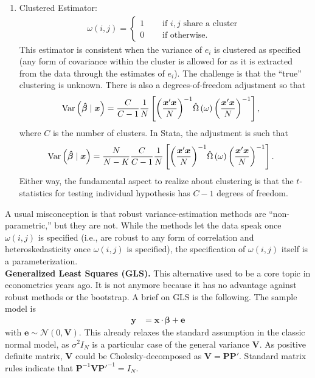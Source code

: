 \begin{enumerate}
\item Clustered Estimator: 
		\begin{align}
			\omega \left( i, j \right) = \left\{
        \begin{array}{ll}
            1 & \quad \text{ if }i,j \text{ share a cluster } \\
            0 & \quad \text{ if otherwise}.
        \end{array}
    		\right.
		\end{align}
This estimator is consistent when the variance of $e_i$ is clustered as specified (any form of covariance within the cluster is allowed for as it is extracted from the data through the estimates of $e_i$). The challenge is that the ``true'' clustering is unknown. There is also a degrees-of-freedom adjustment so that 
\begin{align}
	\operatorname{Var} \left( \bm{\hat{\beta}} \mid \bm{x} \right) & = \frac{ C }{ C - 1 }\frac{1}{N} \left[ { \left(  \frac{\bm{x}' \bm{x} }{N} \right)}^{-1} \hat{\Omega} \left( \omega \right) { \left(  \frac{\bm{x}' \bm{x} }{N} \right)}^{-1} \right], 
\end{align}
\noindent where $C$ is the number of clusters. In Stata, the adjustment is such that 
\begin{align}
	\operatorname{Var} \left( \bm{\hat{\beta}} \mid \bm{x} \right) & = \frac{ N }{ N - K } \frac{ C }{ C - 1 }\frac{1}{N} \left[ { \left(  \frac{\bm{x}' \bm{x} }{N} \right)}^{-1} \hat{\Omega} \left( \omega \right) { \left(  \frac{\bm{x}' \bm{x} }{N} \right)}^{-1} \right]. 
\end{align}
\noindent Either way, the fundamental aspect to realize about clustering is that the $t$-statistics for testing individual hypothesis has $C-1$ degrees of freedom. 
\end{enumerate}

\noindent A usual misconception is that robust variance-estimation methods are ``non-parametric,'' but they are not. While the methods let the data speak once $\omega \left( i , j \right) $ is specified (i.e., are robust to any form of correlation and heteroskedasticity once $\omega \left( i , j \right) $ is specified), the specification of $\omega \left( i , j \right) $ itself is a parameterization. \\

\noindent \textbf{Generalized Least Squares (GLS).} This alternative used to be a core topic in econometrics years ago. It is not anymore because it has no advantage against robust methods or the bootstrap. A brief on GLS is the following. The sample model is 
\begin{align}
	\bm{y} & = \bm{x} \cdot \bm{\beta} + \bm{e} 
\end{align}
\noindent with $\bm{e} \sim \mathcal{N} \left( 0, \bm{V} \right)$. This already relaxes the standard assumption in the classic normal model, as $\sigma^2 I_N$ is a particular case of the general variance $\bm{V}$. As positive definite matrix, $\bm{V}$ could be Cholesky-decomposed as  $\bm{V} = \bm{P} \bm{P}'$. Standard matrix rules indicate that ${\bm{P}}^{-1} \bm{V} {\bm{P'}}^{-1} = I_N$. 

